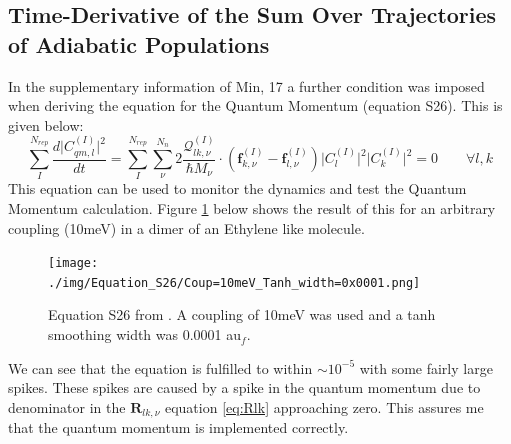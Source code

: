 \subsection{Time-Derivative of the Sum Over Trajectories of Adiabatic Populations}
In the supplementary information of Min, 17 \cite{min_ab_2017} a further condition was imposed when deriving the equation for the Quantum Momentum (equation S26). This is given below:
\begin{equation}
  \sum_{I}^{N_{rep}} \frac{d\vert C_{qm, l}^{(I)} \vert^2}{dt} = \sum_{I}^{N_{rep}} \sum_{\nu}^{N_n} 2 \frac{\mathcal{Q}_{lk, \nu}^{(I)}}{\hbar M_{\nu}} \cdot \left( \textbf{f}_{k, \nu}^{(I)} - \textbf{f}_{l, \nu}^{(I)} \right) \vert C_{l}^{(I)}\vert^2 \vert C_{k}^{(I)}\vert^2 = 0 \qquad \forall l, k
  \label{eq:S26}
\end{equation}
This equation can be used to monitor the dynamics and test the Quantum Momentum calculation. Figure \ref{fig:S26_10meV_0.0001auf} below shows the result of this for an arbitrary coupling (10meV) in a dimer of an Ethylene like molecule.
\begin{figure}[H]
  \texttt{[image: ./img/Equation\_S26/Coup=10meV\_Tanh\_width=0x0001.png]}
  \caption{\label{fig:S26_10meV_0.0001auf}Equation S26 from \cite{min_ab_2017}. A coupling of 10meV was used and a tanh smoothing width was 0.0001 au$_f$.}
\end{figure}
\noindent We can see that the equation is fulfilled to within $\sim 10^{-5}$ with some fairly large spikes. These spikes are caused by a spike in the quantum momentum due to denominator in the $\textbf{R}_{lk, \nu}$ equation \eqref{eq:Rlk} approaching zero. This assures me that the quantum momentum is implemented correctly.


\newpage
